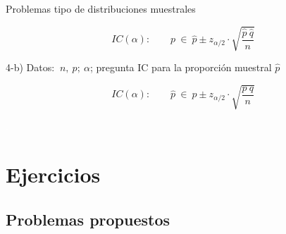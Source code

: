 \begin{myalertblock}{Problemas tipo de distribuciones muestrales}
\begin{destacado}
	$$IC(\alpha):\qquad p \ \in \  \widehat p \pm z_{\alpha/2} \cdot \sqrt{\dfrac{\widehat p \ \widehat q}{n}}$$
	
	\vspace{5mm} \vspace{5mm} 4-b) Datos: $\ n, \ p;\ \alpha$; pregunta IC para la proporción muestral $\widehat p$
	
	$$IC(\alpha):\qquad \widehat p \ \in \  p \pm z_{\alpha/2} \cdot \sqrt{\dfrac{ p \  q}{n}}$$
\end{destacado}

\vspace{3mm}   \textcolor{white}{.}

\end{myalertblock}


\section{Ejercicios}

\subsection{Problemas propuestos}

